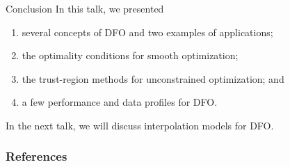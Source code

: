 \documentclass{polyu-presentation}
\begin{document}
\begin{frame}{Conclusion}
    In this talk, we presented
    \begin{enumerate}
        \item several \alert{concepts of DFO} and two examples of \alert{applications};
        \item the \alert{optimality conditions} for smooth optimization;
        \item the \alert{trust-region methods} for unconstrained optimization; and
        \item a few \alert{performance and data profiles} for DFO.
    \end{enumerate}

    \bigskip

    In the next talk, we will discuss \alert{interpolation models for DFO}.
\end{frame}

\appendix

\begin{frame}[t,allowframebreaks]
    \frametitle{References}

	\printbibliography
\end{frame}
\end{document}
